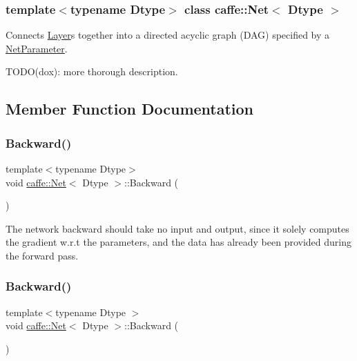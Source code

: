 \subsubsection*{template$<$typename Dtype$>$\newline
class caffe\+::\+Net$<$ Dtype $>$}

Connects \mbox{\hyperlink{classcaffe_1_1_layer}{Layer}}s together into a directed acyclic graph (D\+AG) specified by a \mbox{\hyperlink{classcaffe_1_1_net_parameter}{Net\+Parameter}}. 

T\+O\+D\+O(dox)\+: more thorough description. 

\subsection{Member Function Documentation}
\mbox{\label{classcaffe_1_1_net_a7a1a6d17347106dd1284b1b6d28cb4e9}} 
\subsubsection{\texorpdfstring{Backward()}{Backward()}\hspace{0.1cm}{\footnotesize\ttfamily [1/2]}}
{\footnotesize\ttfamily template$<$typename Dtype$>$ \\
void \mbox{\hyperlink{classcaffe_1_1_net}{caffe\+::\+Net}}$<$ Dtype $>$\+::Backward (\begin{DoxyParamCaption}{ }\end{DoxyParamCaption})}

The network backward should take no input and output, since it solely computes the gradient w.\+r.\+t the parameters, and the data has already been provided during the forward pass. \mbox{\label{classcaffe_1_1_net_a7a1a6d17347106dd1284b1b6d28cb4e9}} 
\subsubsection{\texorpdfstring{Backward()}{Backward()}\hspace{0.1cm}{\footnotesize\ttfamily [2/2]}}
{\footnotesize\ttfamily template$<$typename Dtype $>$ \\
void \mbox{\hyperlink{classcaffe_1_1_net}{caffe\+::\+Net}}$<$ Dtype $>$\+::Backward (\begin{DoxyParamCaption}{ }\end{DoxyParamCaption})}


